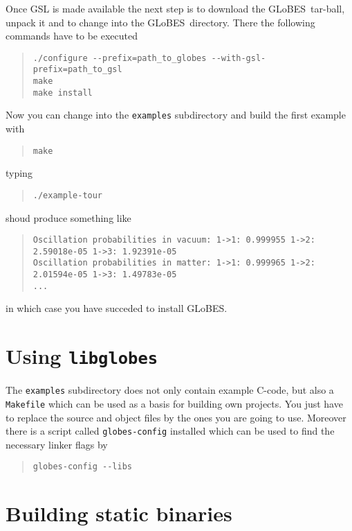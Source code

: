 \documentclass{article}
\newcommand{\glb}{{\sf GLoBES}}
\begin{document}
Once GSL is made available the next step is to download
the \glb\ tar-ball, unpack it and to change into the \glb\
directory. There the following commands have to be executed
\begin{quote}
\begin{verbatim}
./configure --prefix=path_to_globes --with-gsl-prefix=path_to_gsl
make
make install
\end{verbatim}
\end{quote}
Now you can change into the \verb^examples^ subdirectory
and build the first example with
\begin{quote}
\begin{verbatim}
make
\end{verbatim}
\end{quote}
typing
\begin{quote}
\begin{verbatim}
./example-tour
\end{verbatim}
\end{quote}
shoud produce something like
\begin{quote}
{\small
\begin{verbatim}
Oscillation probabilities in vacuum: 1->1: 0.999955 1->2: 2.59018e-05 1->3: 1.92391e-05
Oscillation probabilities in matter: 1->1: 0.999965 1->2: 2.01594e-05 1->3: 1.49783e-05
...
\end{verbatim}
}
\end{quote}
in which case you have succeded to install \glb.

\section{Using {\tt libglobes}}

The \verb^examples^ subdirectory does not only contain example C-code, but also a \verb^Makefile^ which can be used as a basis for building own projects. You just have to replace the
source and object files by the ones you are going to use. Moreover there is a script
called \verb^globes-config^ installed which can be used to find the necessary linker
flags by
\begin{quote}
\begin{verbatim}
globes-config --libs
\end{verbatim}
\end{quote}


\section{Building static binaries}
\end{document}
